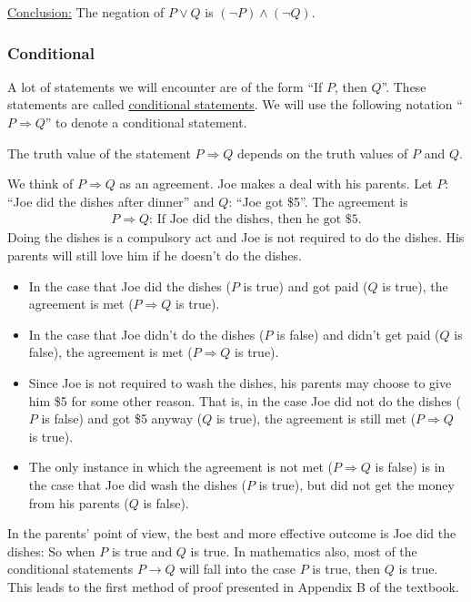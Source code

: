 \underline{Conclusion:} The negation of $P \vee Q$ is $(\neg P) \wedge (\neg Q)$.

\subsubsection*{Conditional}

A lot of statements we will encounter are of the form ``If $P$, then $Q$''. These statements are called \underline{conditional statements}. We will use the following notation ``$P \Rightarrow Q$'' to denote a conditional statement.

The truth value of the statement $P \Rightarrow Q$ depends on the truth values of $P$ and $Q$.

\begin{example}
We think of $P \Rightarrow Q$ as an agreement. Joe makes a deal with his parents. Let $P$: ``Joe did the dishes after dinner'' and $Q$: ``Joe got \$5''. The agreement is
	\begin{align*}
	P \Rightarrow Q : \, \text{If Joe did the dishes, then he got \$5.}
	\end{align*}
Doing the dishes is a compulsory act and Joe is not required to do the dishes. His parents will still love him if he doesn't do the dishes.
	\begin{itemize}
		\item In the case that Joe did the dishes ($P$ is true) and got paid ($Q$ is true), the agreement is met ($P \Rightarrow Q$ is true). 
		\item In the case that Joe didn't do the dishes ($P$ is false) and didn't get paid ($Q$ is false), the agreement is met ($P \Rightarrow Q$ is true). 
		\item Since Joe is not required to wash the dishes, his parents may choose to give him \$5 for some other reason. That is, in the case Joe did not do the dishes ($P$ is false) and got \$5 anyway ($Q$ is true), the agreement is still met ($P \Rightarrow Q$ is true). 
		\item The only instance in which the agreement is not met ($P \Rightarrow Q$ is false) is in the case that Joe did wash the dishes ($P$ is true), but did not get the money from his parents ($Q$ is false).
	\end{itemize}
\end{example}

In the parents' point of view, the best and more effective outcome is Joe did the dishes: So when $P$ is true and $Q$ is true. In mathematics also, most of the conditional statements $P \rightarrow Q$ will fall into the case $P$ is true, then $Q$ is true. This leads to the first method of proof presented in Appendix B of the textbook.

